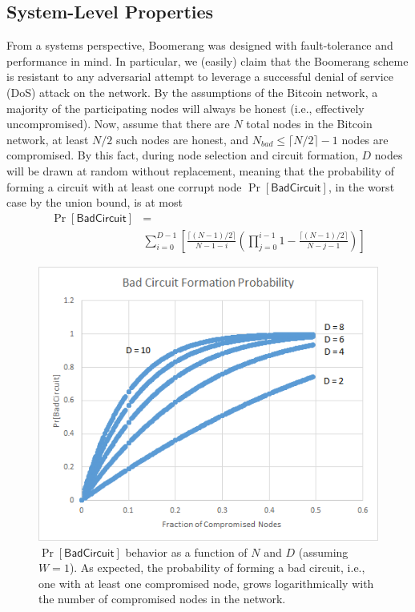 \subsection{System-Level Properties}
From a systems perspective, Boomerang was designed with fault-tolerance and performance in mind. In particular, we (easily) claim that the Boomerang scheme is resistant to any adversarial attempt to leverage a successful denial of service (DoS) attack on the network. By the assumptions of the Bitcoin network, a majority of the participating nodes will always be honest (i.e., effectively uncompromised). Now, assume that there are $N$ total nodes in the Bitcoin network, at least $N/2$ such nodes are honest, and $N_{bad} \leq \lceil N/2 \rceil - 1$ nodes are compromised. By this fact, during node selection and circuit formation, $D$ nodes will be drawn at random without replacement, meaning that the probability of forming a circuit with at least one corrupt node $\Pr[\mathsf{BadCircuit}]$, in the worst case by the union bound, is at most
\begin{align*}
\Pr[\mathsf{BadCircuit}] & = \\
& \sum_{i=0}^{D-1} \left[ \frac{\lceil (N-1)/2 \rceil}{N - 1 - i}\left( \prod_{j=0}^{i-1} 1 - \frac{ \lceil (N-1)/2 \rceil}{N-j-1} \right) \right]
\end{align*}

\begin{figure}[ht!]
\begin{center}
\includegraphics[scale=0.65]{./images/badcircuit.png}
\caption{$\Pr[\mathsf{BadCircuit}]$ behavior as a function of $N$ and $D$ (assuming $W = 1$). As expected, the probability of forming a bad circuit, i.e., one with at least one compromised node, grows logarithmically with the number of compromised nodes in the network.}
\label{fig:bitcoin_peer_protocol}
\end{center}
\end{figure}

